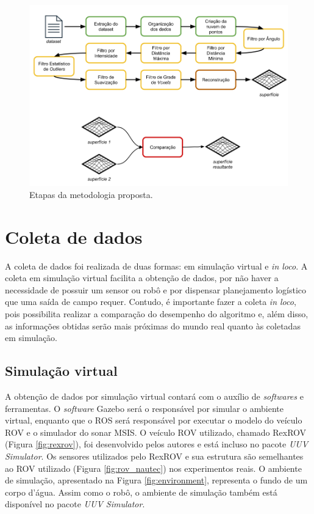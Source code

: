 \begin{figure}[H]
    \centering
    \includegraphics[scale=0.4]{dados/figuras/etapas.png}
    \caption{Etapas da metodologia proposta.}
    \label{fig:etapas}
\end{figure}

\section{Coleta de dados}
\label{sec:coleta_dados}

A coleta de dados foi realizada de duas formas: em simulação virtual e \textit{in loco}. 
A coleta em simulação virtual facilita a obtenção de dados, por não haver a necessidade de possuir um sensor ou robô e por dispensar planejamento logístico que uma saída de campo requer. 
Contudo, é importante fazer a coleta \textit{in loco}, pois possibilita realizar a comparação do desempenho do algoritmo e, além disso, as informações obtidas serão mais próximas do mundo real quanto às coletadas em simulação.

\subsection{Simulação virtual}
\label{sec:simulation}

A obtenção de dados por simulação virtual contará com o auxílio de \textit{softwares} e ferramentas. 
O \textit{software} Gazebo será o responsável por simular o ambiente virtual, enquanto que o ROS será responsável por executar o modelo do veículo ROV e o simulador do sonar MSIS.
O veículo ROV utilizado, chamado RexROV (Figura \ref{fig:rexrov}), foi desenvolvido pelos autores \cite{manhaes2016uuv} e está incluso no pacote \textit{UUV Simulator}.
Os sensores utilizados pelo RexROV e sua estrutura são semelhantes ao ROV utilizado (Figura \ref{fig:rov_nautec}) nos experimentos reais.
O ambiente de simulação, apresentado na Figura \ref{fig:environment}, representa o fundo de um corpo d'água.
Assim como o robô, o ambiente de simulação também está disponível no pacote \textit{UUV Simulator}.

